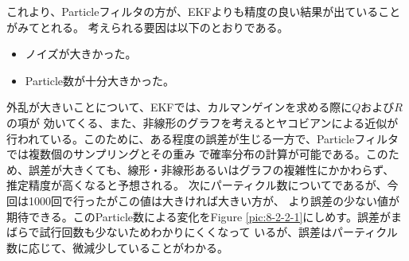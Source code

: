 これより、Particleフィルタの方が、EKFよりも精度の良い結果が出ていることがみてとれる。
考えられる要因は以下のとおりである。
\begin{itemize}
  \item ノイズが大きかった。
  \item Particle数が十分大きかった。
\end{itemize}
外乱が大きいことについて、EKFでは、カルマンゲインを求める際に$Q$および$R$の項が
効いてくる、また、非線形のグラフを考えるとヤコビアンによる近似が
行われている。このために、ある程度の誤差が生じる一方で、Particleフィルタでは複数個のサンプリングとその重み
で確率分布の計算が可能である。このため、誤差が大きくても、線形・非線形あるいはグラフの複雑性にかかわらず、
推定精度が高くなると予想される。
次にパーティクル数についてであるが、今回は1000回で行ったがこの値は大きければ大きい方が、
より誤差の少ない値が期待できる。このParticle数による変化をFigure \ref{pic:8-2-2-1}にしめす。誤差がまばらで試行回数も少ないためわかりにくくなって
いるが、誤差はパーティクル数に応じて、微減少していることがわかる。

